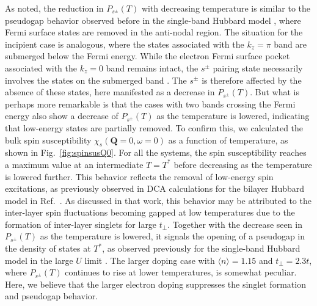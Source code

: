 \documentclass[prb,twocolumn,amsmath,amssymb,superscriptaddress,floatfix,nofootinbib]{revtex4-2}
\begin{document}
As noted, the reduction in $P_{s^\pm}(T)$ with decreasing temperature is similar to the pseudogap behavior observed before in the single-band Hubbard model \cite{Maier2016}, where Fermi surface states are removed in the anti-nodal region. The situation for the incipient case is analogous, where the states associated with the $k_z = \pi$ band are submerged below the Fermi energy. While the electron Fermi surface pocket associated with the $k_z = 0$ band remains intact, the $s^\pm$ pairing state necessarily involves the states on the submerged band \cite{Maier2019}. The $s^\pm$ is therefore affected by the absence of these states, here manifested as a decrease in $P_{s^\pm}(T)$. But what is perhaps more remarkable is that the cases with two bands crossing the Fermi energy also show a decrease of $P_{s^\pm}(T)$ as the temperature is lowered, indicating that low-energy states are partially removed. To confirm this, we calculated the bulk spin susceptibility $\chi_s(\mathbf{Q}=0, \omega=0)$ as a function of temperature, as shown in Fig.~\ref{fig:spinsusQ0}. For all the systems, the spin susceptibility reaches a maximum value at an intermediate $T = T^*$ before decreasing as the temperature is lowered further. This behavior reflects the removal of low-energy spin excitations, as previously observed in DCA calculations for the bilayer Hubbard model in Ref.~. As discussed in that work, this behavior may be attributed to the inter-layer spin fluctuations becoming gapped at low temperatures due to the formation of inter-layer singlets for large $t_\perp$. Together with the decrease seen in $P_{s^\pm}(T)$ as the temperature is lowered, it signals the opening of a pseudogap in the density of states at $T^*$, as observed previously for the single-band Hubbard model in the large $U$ limit \cite{Maier2016, Maier2019_2}. The larger doping case with $\langle n\rangle=1.15$ and $t_\perp=2.3t$, where $P_{s^\pm}(T)$ continues to rise at lower temperatures, is somewhat peculiar. Here, we believe that the larger electron doping suppresses the singlet formation and pseudogap behavior. 
\end{document}
